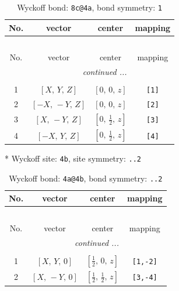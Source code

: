 \documentclass[fleqn,8pt]{jsarticle}
\begin{document}
\renewcommand{\arraystretch}{1.2}
\begin{longtable}{cccc}
\caption{Wyckoff bond: {\tt 8c@4a}, bond symmetry: {\tt 1}}
 \\
 \hline \hline
No. & vector & center & mapping \\ \hline \endfirsthead

\multicolumn{3}{l}{\tablename\ \thetable{}} \\
 \hline \hline
No. & vector & center & mapping \\ \hline \endhead

 \hline \hline
\multicolumn{3}{r}{\footnotesize\it continued ...} \\ \endfoot

 \hline \hline
\multicolumn{3}{r}{} \\ \endlastfoot

1 & $\left[ X,\, Y,\, Z \right]$ & $\left[ 0,\, 0,\, z \right]$ & {\tt [1]} \\ \hline
2 & $\left[ - X,\, - Y,\, Z \right]$ & $\left[ 0,\, 0,\, z \right]$ & {\tt [2]} \\ \hline
3 & $\left[ X,\, - Y,\, Z \right]$ & $\left[ 0,\, \frac{1}{2},\, z \right]$ & {\tt [3]} \\ \hline
4 & $\left[ - X,\, Y,\, Z \right]$ & $\left[ 0,\, \frac{1}{2},\, z \right]$ & {\tt [4]} \\
\end{longtable}
* Wyckoff site: {\tt 4b}, site symmetry: {\tt ..2}
\renewcommand{\arraystretch}{1.2}
\begin{longtable}{cccc}
\caption{Wyckoff bond: {\tt 4a@4b}, bond symmetry: {\tt ..2}}
 \\
 \hline \hline
No. & vector & center & mapping \\ \hline \endfirsthead

\multicolumn{3}{l}{\tablename\ \thetable{}} \\
 \hline \hline
No. & vector & center & mapping \\ \hline \endhead

 \hline \hline
\multicolumn{3}{r}{\footnotesize\it continued ...} \\ \endfoot

 \hline \hline
\multicolumn{3}{r}{} \\ \endlastfoot

1 & $\left[ X,\, Y,\, 0 \right]$ & $\left[ \frac{1}{2},\, 0,\, z \right]$ & {\tt [1,-2]} \\ \hline
2 & $\left[ X,\, - Y,\, 0 \right]$ & $\left[ \frac{1}{2},\, \frac{1}{2},\, z \right]$ & {\tt [3,-4]} \\
\end{longtable}
\end{document}
